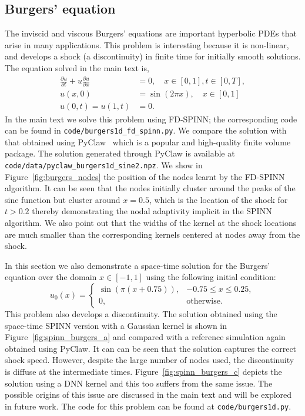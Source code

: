 \documentclass[12pt]{article}
\newcommand{\code}[1]{\lstinline{#1}}
\begin{document}
\subsection{Burgers' equation}
The inviscid and viscous Burgers' equations are important hyperbolic PDEs that arise in many applications.  This problem is interesting because it is non-linear, and develops a shock (a discontinuity) in finite time for initially smooth solutions.  The equation solved in the main text is,
\begin{displaymath}
\begin{split}
\frac{\partial u}{\partial t} + u \frac{\partial u}{\partial x} &= 0,  \quad x \in [0, 1], t \in [0, T],\\
u(x, 0) &= \sin(2 \pi x),  \quad x \in [0, 1]\\
u(0, t) = u(1, t) &= 0.
\end{split}
\end{displaymath}
In the main text we solve this problem using FD-SPINN; the corresponding code can be found in \code{code/burgers1d_fd_spinn.py}.  We compare the solution with that obtained using PyClaw~\cite{pyclaw} which is a popular and high-quality finite volume package.  The solution generated through PyClaw is  available at \code{code/data/pyclaw_burgers1d_sine2.npz}.
We show in Figure~\ref{fig:burgers_nodes} the position of the nodes learnt by the FD-SPINN algorithm.  It can be seen that the nodes initially cluster around the peaks of the sine function but cluster around $x=0.5$, which is the location of the shock for $t> 0.2$ thereby demonstrating the nodal adaptivity implicit in the SPINN algorithm.  We also point out that the widths of the kernel at the shock locations are much smaller than the corresponding kernels centered at nodes away from the shock.

In this section we also demonstrate a space-time solution for the Burgers' equation over the domain $x \in [-1, 1]$ using the following initial condition:
\begin{displaymath}
u_0(x) = \begin{cases}
\sin(\pi(x + 0.75)), & -0.75 \le x \le 0.25,\\
0, & \text{otherwise}.
\end{cases}
\end{displaymath}
This problem also develops a discontinuity. The solution obtained using the space-time SPINN version with a Gaussian kernel is shown in Figure~\ref{fig:spinn_burgers_a} and compared with a reference simulation again obtained using PyClaw.  It can  can be seen that the solution captures the correct shock speed.  However, despite the large number of nodes used, the discontinuity is diffuse at the intermediate times.
Figure~\ref{fig:spinn_burgers_c} depicts the solution using a DNN kernel and this too suffers from the same issue.  The possible origins of this issue are discussed in the main text and will be explored in future work. The code for this problem can be found at \code{code/burgers1d.py}.
\end{document}
